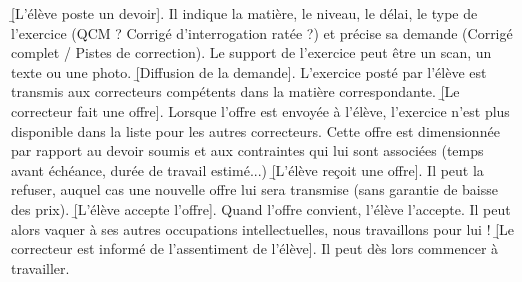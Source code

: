 \begin{enumerate}
\li \b[L’élève poste un devoir]. Il indique la matière, le niveau, le délai, le type de l’exercice (QCM ? Corrigé d’interrogation ratée ?) et précise sa demande (Corrigé complet / Pistes de correction). Le support de l’exercice peut être un scan, un texte ou une photo.
\li \b[Diffusion de la demande]. L’exercice posté par l’élève est transmis aux correcteurs compétents dans la matière correspondante.
\li \b[Le correcteur fait une offre].  Lorsque l’offre est envoyée à l’élève, l’exercice n’est plus disponible dans la liste pour les autres correcteurs. Cette offre est dimensionnée par rapport au devoir soumis et aux contraintes qui lui sont associées (temps avant échéance, durée de travail estimé...)
\li \b[L’élève reçoit une offre]. Il peut la refuser, auquel cas une nouvelle offre lui sera transmise (sans garantie de baisse des prix).
\li \b[L’élève accepte l’offre]. Quand l’offre convient, l’élève l’accepte. Il peut alors vaquer à ses autres occupations intellectuelles, nous travaillons pour lui !
\li \b[Le correcteur est informé de l’assentiment de l’élève]. Il peut dès lors commencer à travailler.
\end{enumerate}